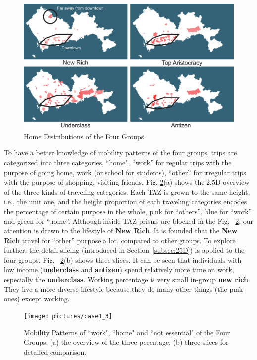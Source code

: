 \documentclass{ieeeaccess}
\begin{document}
\begin{figure}[htb!]
 \centering %
 \includegraphics[width=\columnwidth]{pictures/case1_2}
 \caption{Home Distributions of the Four Groups}
 \label{case12}
\end{figure}


To have a better knowledge of mobility patterns of the four groups, trips are categorized into three categories, ``home", ``work'' for regular trips with the purpose of going home, work (or school for students), ``other'' for irregular trips with the purpose of shopping, visiting friends. Fig. \ref{case13}(a) shows the 2.5D overview of the three kinds of traveling categories. Each TAZ is grown to the same height, i.e., the unit one, and the height proportion of each traveling categories encodes the percentage of certain purpose in the whole, pink for ``others'', blue for ``work'' and green for ``home''. Although inside TAZ prisms are blocked in the Fig. ~\ref{case13}, our attention is drawn to the lifestyle of \textbf{New Rich}. It is founded that the \textbf{New Rich} travel for ``other'' purpose a lot, compared to other groups. To explore further, the detail slicing (introduced in Section~\ref{subsec:25D}) is applied to the four groups. Fig. ~\ref{case13}(b) shows three slices. It can be seen that individuals with low income (\textbf{underclass} and \textbf{antizen}) spend relatively more time on work, especially the \textbf{underclass}. Working percentage is very small in-group \textbf{new rich}. They live a more diverse lifestyle because they do many other things (the pink ones) except working.


\begin{figure}[htb!]
 \centering %
 \texttt{[image: pictures/case1\_3]}
 \caption{Mobility Patterns of ``work", ``home" and ``not essential" of the Four Groups: (a) the overview of the three pecentage; (b) three slices for detailed comparison.}
 \label{case13}
\end{figure}
\end{document}
